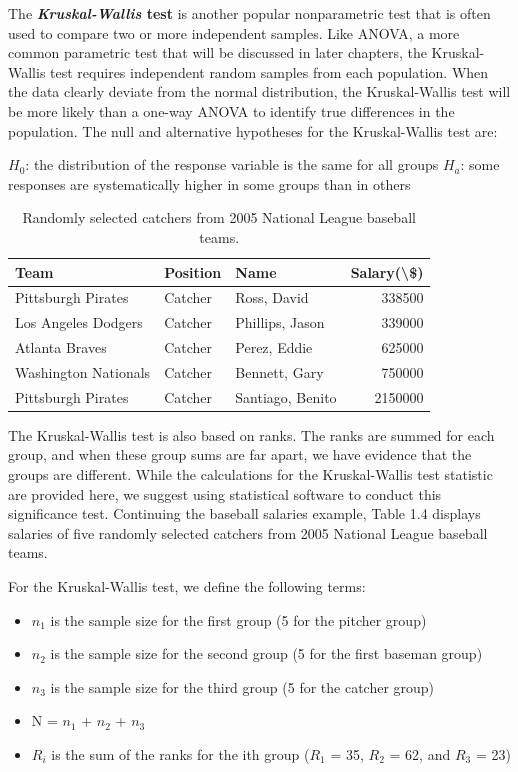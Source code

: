 \documentclass[
]{report}
\providecommand{\tightlist}{%
  \setlength{\itemsep}{0pt}\setlength{\parskip}{0pt}}
\begin{document}
The \textbf{\emph{Kruskal-Wallis} test} is another popular nonparametric test that is often used to compare two or more independent samples. Like ANOVA, a more common parametric test that will be discussed in later chapters, the Kruskal-Wallis test requires independent random samples from each population. When the data clearly deviate from the normal distribution, the Kruskal-Wallis test will be more likely than a one-way ANOVA to identify true differences in the population. The null and alternative hypotheses for the Kruskal-Wallis test are:

\(H_0\): the distribution of the response variable is the same for all groups
\(H_a\): some responses are systematically higher in some groups than in others

\begin{table}

\caption{\label{tab:table4}Randomly selected catchers from 2005 National League baseball teams.}
\centering
\begin{tabular}[t]{lllr}
\toprule
Team & Position & Name & Salary(\textbackslash{}\$)\\
\midrule
Pittsburgh Pirates & Catcher & Ross, David & 338500\\
Los Angeles Dodgers & Catcher & Phillips, Jason & 339000\\
Atlanta Braves & Catcher & Perez, Eddie & 625000\\
Washington Nationals & Catcher & Bennett, Gary & 750000\\
Pittsburgh Pirates & Catcher & Santiago, Benito & 2150000\\
\bottomrule
\end{tabular}
\end{table}

The Kruskal-Wallis test is also based on ranks. The ranks are summed for each group, and when these group sums are far apart, we have evidence that the groups are different. While the calculations for the Kruskal-Wallis test statistic are provided here, we suggest using statistical software to conduct this significance test. Continuing the baseball salaries example, Table 1.4 displays salaries of five randomly selected catchers from 2005 National League baseball teams.

For the Kruskal-Wallis test, we define the following terms:

\begin{itemize}
\tightlist
\item
  \(n_1\) is the sample size for the first group (5 for the pitcher group)
\item
  \(n_2\) is the sample size for the second group (5 for the first baseman group)
\item
  \(n_3\) is the sample size for the third group (5 for the catcher group)
\item
  N = \(n_1\) + \(n_2\) + \(n_3\)
\item
  \(R_i\) is the sum of the ranks for the ith group (\(R_1\) = 35, \(R_2\) = 62, and \(R_3\) = 23)
\end{itemize}
\end{document}
